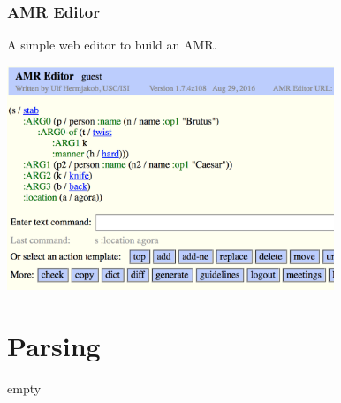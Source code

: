 \documentclass{beamer}
\begin{document}
\begin{frame}
    \frametitle{AMR Editor}

    A simple web editor to build an AMR.

    \begin{center}
        \includegraphics[height=6.7cm,width=9.8cm]{img/amr-editor.png}
    \end{center}
\end{frame}

\section{Parsing}

\begin{frame}
    empty
\end{frame}
\end{document}

